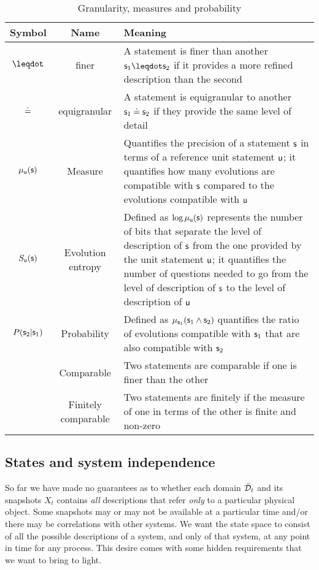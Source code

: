 \documentclass[letterpaper]{article}
\begin{document}
\begin{table}[h!]
	\centering
	\begin{tabular}[h]{|c|c|p{6cm}|}
		\hline 
		Symbol & Name & Meaning \\ 
		\hline 
		$\finer$ & finer & A statement is finer than another $\stmt_1 \finer \stmt_2$ if it provides a more refined description than the second \\ 
		\hline 
		$\eqgran$ & equigranular & A statement is equigranular to another $\stmt_1 \eqgran \stmt_2$ if they provide the same level of detail \\ 
		\hline 
		$\mu_{\stmt[u]}(\stmt)$ & Measure & Quantifies the precision of a statement $\stmt$ in terms of a reference unit statement $\stmt[u]$; it quantifies how many evolutions are compatible with $\stmt$ compared to the evolutions compatible with $\stmt[u]$  \\ 
		\hline 
		$S_{\stmt[u]}(\stmt)$ & Evolution entropy & Defined as $\log \mu_{\stmt[u]}(\stmt)$ represents the number of bits that separate the level of description of $\stmt$ from the one provided by the unit statement $\stmt[u]$; it quantifies the number of questions needed to go from the level of description of $\stmt$ to the level of description of $\stmt[u]$  \\ 
		\hline 
		$P(\stmt_2 | \stmt_1)$ & Probability & Defined as $\mu_{\stmt_1}(\stmt_1 \AND \stmt_2)$ quantifies the ratio of evolutions compatible with $\stmt_1$ that are also compatible with $\stmt_2$  \\ 
		\hline 
		 & Comparable & Two statements are comparable if one is finer than the other \\ 
		\hline 
		 & Finitely comparable & Two statements are finitely if the measure of one in terms of the other is finite and non-zero \\ 
		\hline 
	\end{tabular} 
	\caption{Granularity, measures and probability}
	\label{table:states}
\end{table}

\subsection{States and system independence}

So far we have made no guarantees as to whether each domain $\tdomain_t$ and its snapshots $X_t$ contains \emph{all} descriptions that refer \emph{only} to a particular physical object. Some snapshots may or may not be available at a particular time and/or there may be correlations with other systems. We want the state space to consist of all the possible descriptions of a system, and only of that system, at any point in time for any process. This desire comes with some hidden requirements that we want to bring to light.
\end{document}
